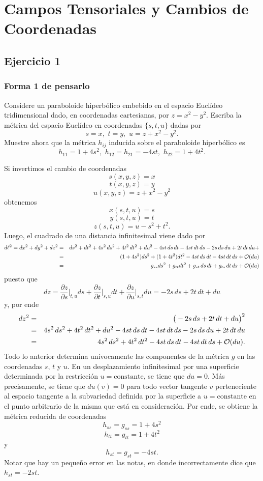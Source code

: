 \documentclass[aps,prl,twocolumn,groupedaddress]{revtex4-2}
\newcommand{\bigo}{\mathcal{O}}
\begin{document}
\section{Campos Tensoriales y Cambios de Coordenadas}

\subsection{Ejercicio 1}


\subsubsection{Forma 1 de pensarlo}

Considere un paraboloide hiperb\'olico embebido en el espacio Eucl\'ideo tridimensional dado, en coordenadas cartesianas, por $z=x^2-y^2$.
Escriba la m\'etrica del espacio Eucl\'ideo en coordenadas $\{s,t,u\}$ dadas por 
$$
s=x,\,\, t=y,\,\, u=z+x^2-y^2.
$$
Muestre ahora que la m\'etrica $h_{ij}$ inducida sobre el paraboloide hiperb\'olico es
$$
h_{11}=1+4s^2,\,\,
h_{12}=h_{21} = -4st,\,\,
h_{22}=1+4t^2.
$$

Si invertimos el cambio de coordenadas
$$
s(x,y,z)=x
$$
$$
t(x,y,z)=y
$$
$$
u(x,y,z)=z+x^2-y^2
$$
obtenemos
$$
x(s,t,u)=s
$$
$$
y(s,t,u)=t
$$
$$
z(s,t,u)=u-s^2+t^2
.
$$
Luego, el cuadrado de una distancia infinitesimal viene dado por
\begin{eqnarray}
d\ell^2
=
dx^2
+
dy^2
+
dz^2
&=&
ds^2
+
dt^2
+
4s^2\,ds^2
+
4t^2\,dt^2
+
du^2
-
4st\,ds\,dt
-
4st\,dt\,ds
-
2s\,ds\,du
+
2t\,dt\,du
+
\notag
\\
&=&
(1+4s^2)ds^2
+
(1+4t^2)dt^2
-
4st\,ds\,dt
-
4st\,dt\,ds
+
\bigo(du)
\notag
\\
&=&
g_{ss}ds^2
+
g_{tt}dt^2
+
g_{st}\,ds\,dt
+
g_{ts}\,dt\,ds
+
\bigo(du)
\notag
\end{eqnarray}
puesto que
$$
dz
=
\frac{\partial z}{\partial s}\bigg|_{t,u}
ds
+
\frac{\partial z}{\partial t}\bigg|_{s,u}
dt
+
\frac{\partial z}{\partial u}\bigg|_{s,t}
du
=
-2s\,ds
+2t\,dt
+du
$$
y, por ende
\begin{eqnarray}
dz^2
&=&
\big(
-2s\,ds
+2t\,dt
+du
\big)^2
\notag
\\
&=&
4s^2\,ds^2
+
4t^2\,dt^2
+
du^2
-
4st\,ds\,dt
-
4st\,dt\,ds
-
2s\,ds\,du
+
2t\,dt\,du
\notag
\\
&=&
4s^2\,ds^2
+
4t^2\,dt^2
-
4st\,ds\,dt
-
4st\,dt\,ds
+
\bigo(du)
.
\notag
\end{eqnarray}
Todo lo anterior determina unívocamente las componentes de la m\'etrica $g$ en las coordenadas $s$, $t$ y $u$.
En un desplazamiento infinitesimal por una superficie determinada por la restricci\'on $u=\mathrm{constante}$, se tiene que $du=0$.
M\'as precisamente, se tiene que $du(v)=0$ para todo vector tangente $v$ perteneciente al espacio tangente a la subvariedad definida por la superficie a $u=\mathrm{constante}$ en el punto arbitrario de la misma que está en consideración.
Por ende, se obtiene la m\'etrica reducida de coordenadas
$$
h_{ss} = g_{ss} = 1+4s^2
$$
$$
h_{tt} = g_{tt} = 1+4t^2
$$
y
$$
h_{st} = g_{st} = -4st
.
$$
Notar que hay un pequeño error en las notas, en donde incorrectamente dice que $h_{st}=-2st$.
\end{document}
